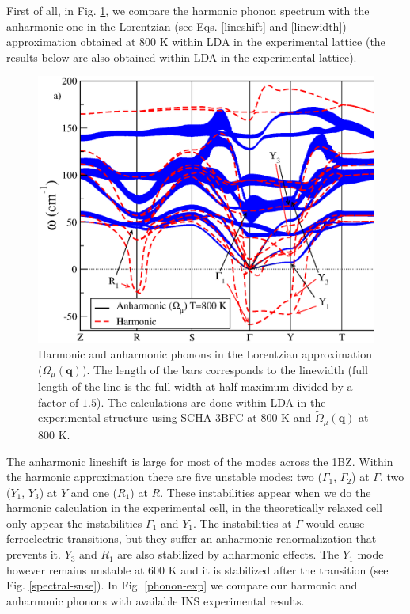 First of all, in Fig. \ref{spectrum-phonon-snse}, we compare the harmonic phonon spectrum with the anharmonic one in the Lorentzian (see Eqs. \ref{lineshift} and \ref{linewidth}) approximation obtained at $800$ K within LDA in 
the experimental lattice (the results below are also obtained within LDA in the experimental lattice).
\begin{figure}[h]
\includegraphics[width=\linewidth]{Figures/spectrum-snse.eps}
\caption[Phonons in the Lorentzian approximation in SnSe.]{Harmonic and anharmonic phonons in the Lorentzian approximation ($\Omega_{\mu}(\mathbf{q})$). The length of the bars corresponds to the linewidth (full length of the line 
is the full width at half maximum divided by a factor of $1.5$). The calculations are done within LDA in the experimental structure using SCHA 3BFC at $800$ K and $\tilde{\Omega}_{\mu}(\mathbf{q})$ at $800$ K.}
\label{spectrum-phonon-snse}
\end{figure}
The anharmonic lineshift is large for most of the modes across the 1BZ. Within the harmonic approximation there are five unstable modes: two ($\Gamma_{1}$, $\Gamma_{2}$) at $\Gamma$, two ($Y_{1}$, $Y_{3}$) at $Y$ and one 
($R_{1}$) at $R$. These instabilities appear when we do the harmonic calculation in the experimental cell, in the theoretically relaxed cell only appear the instabilities $\Gamma_{1}$ and $Y_{1}$. The instabilities at $\Gamma$ would cause ferroelectric transitions\cite{skelton2016anharmonicity,hong2016electronic}, but they suffer an anharmonic renormalization that prevents it. $Y_{3}$ and $R_{1}$ are also stabilized by anharmonic effects. The $Y_{1}$ mode however remains unstable at $600$ K and it is stabilized after the transition (see Fig. \ref{spectral-snse}). In Fig. \ref{phonon-exp} we compare our harmonic and anharmonic phonons with available INS experimental results\cite{chatterji2018soft}. 

